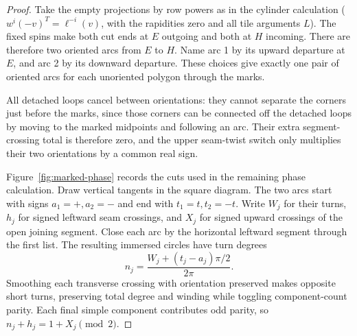 \begin{proof}
Take the empty projections by row powers as in the cylinder calculation (\(w^i(-v)^T=\ell^{-i}(v)\), with the rapidities zero and all tile arguments \(L\)). The fixed spins make both cut ends at \(E\) outgoing and both at \(H\) incoming. There are therefore two oriented arcs from \(E\) to \(H\). Name arc 1 by its upward departure at \(E\), and arc 2 by its downward departure. These choices give exactly one pair of oriented arcs for each unoriented polygon through the marks.

All detached loops cancel between orientations: they cannot separate the corners just before the marks, since those corners can be connected off the detached loops by moving to the marked midpoints and following an arc. Their extra segment-crossing total is therefore zero, and the upper seam-twist switch only multiplies their two orientations by a common real sign.

Figure~\ref{fig:marked-phase} records the cuts used in the remaining phase calculation. Draw vertical tangents in the square diagram. The two arcs start with signs \(a_1=+,a_2=-\) and end with \(t_1=t,t_2=-t\). Write \(W_j\) for their turns, \(h_j\) for signed leftward seam crossings, and \(X_j\) for signed upward crossings of the open joining segment. Close each arc by the horizontal leftward segment through the first list. The resulting immersed circles have turn degrees
\[
 n_j=\frac{W_j+(t_j-a_j)\pi/2}{2\pi}.
\]
Smoothing each transverse crossing with orientation preserved makes opposite short turns, preserving total degree and winding while toggling component-count parity. Each final simple component contributes odd parity, so \(n_j+h_j=1+X_j\pmod2\).


\end{proof}
